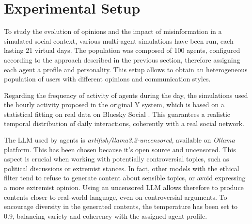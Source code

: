 \section{Experimental Setup}
\label{sec:experiments}


To study the evolution of opinions and the impact of misinformation in a simulated social context, various multi-agent simulations have been run, each lasting 21 virtual days.
The population was composed of 100 agents, configured according to the approach described in the previous section, therefore assigning each agent a profile and personality.
This setup allows to obtain an heterogeneous population of users with different opinions and communication styles.

Regarding the frequency of activity of agents during the day, the simulations used the hourly activity proposed in the original Y system, which is based on a statistical fitting on real data on Bluesky Social \cite{rossetti2024ysocialllmpoweredsocial, failla2024}.
This guarantees a realistic temporal distribution of daily interactions, coherently with a real social network.

\medskip
The LLM used by agents is \textit{artifish/llama3.2-uncensored}, available on \textit{Ollama} platform. 
This has been chosen because it's open source and uncensored.
This aspect is crucial when working with potentially controversial topics, such as political discussions or extremist stances.
In fact, other models with the ethical filter tend to refuse to generate content about sensible topics, or avoid expressing a more extremist opinion.
Using an uncensored LLM allows therefore to produce contents closer to real-world language, even on controversial arguments.
To encourage diversity in the generated contents, the temperature has been set to 0.9, balancing variety and coherency with the assigned agent profile.

